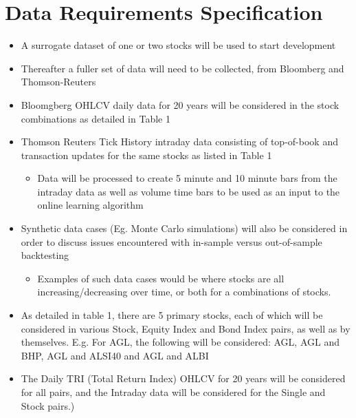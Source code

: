 \documentclass[a4paper,latin]{paper}
\begin{document}
\section{Data Requirements Specification}
\begin{itemize}
\item A surrogate dataset of one or two stocks will be used to start 
development
\item Thereafter a fuller set of data will need to be collected, from Bloomberg 
and Thomson-Reuters
\item Bloomgberg OHLCV daily data for 20 years will be considered in the stock 
combinations as detailed in Table 1
\item Thomson Reuters Tick History intraday data consisting of top-of-book and transaction updates for 
the same stocks as listed in Table 1
\begin{itemize}
\item Data will be processed to create 5 minute and 10 minute bars from the intraday data as well as volume time bars to be used as an input to the online learning algorithm
\end{itemize}
\item Synthetic data cases (Eg. Monte Carlo simulations) will also be considered in order to discuss issues encountered with in-sample versus out-of-sample backtesting
\begin{itemize}
\item Examples of such data cases would be where stocks are all 
increasing/decreasing over time, or both for a combinations of stocks.
\end{itemize}
\item As detailed in table 1, there are 5 primary stocks, each of which will be considered in various 
Stock, Equity Index and Bond Index pairs, as well as by themselves. E.g. For AGL, the following will 
be considered: AGL, AGL and BHP, AGL and ALSI40 and AGL and ALBI
\item The Daily TRI (Total Return Index) OHLCV for 20 years will be considered 
for all pairs, and the Intraday data will be considered for the Single and Stock 
pairs.)
\end{itemize}
\end{document}
